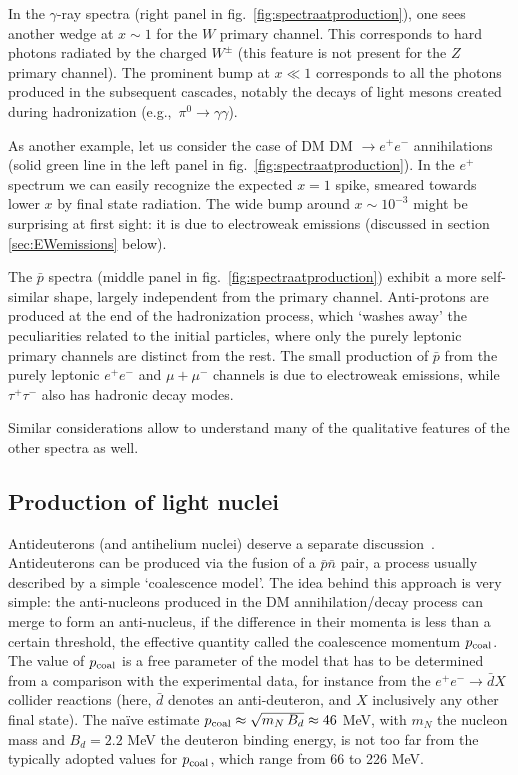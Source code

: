 In the $\gamma$-ray spectra (right panel in fig.~\ref{fig:spectraatproduction}), one sees another wedge at $x \sim 1$ for the $W$ primary channel. This corresponds to hard photons radiated by the charged $W^\pm$ (this feature is not present for the $Z$ primary channel). The prominent bump at $x \ll 1$ corresponds to all the photons produced in the subsequent cascades, notably the decays of light mesons created during hadronization (e.g.,~$\pi^0 \to \gamma \gamma$). 



As another example, let us consider the case of DM DM $\to e^+e^-$ annihilations (solid green line in the left panel in fig.~\ref{fig:spectraatproduction}). In the $e^+$ spectrum we can easily recognize the expected $x=1$ spike, smeared towards lower $x$ by final state radiation. The wide bump around $x\sim 10^{-3}$ might be surprising at first sight: it is due to electroweak emissions (discussed in section \ref{sec:EWemissions} below). 

The $\bar p$ spectra (middle panel in fig.~\ref{fig:spectraatproduction}) exhibit a more self-similar shape, largely independent from the primary channel. Anti-protons are produced at the end of the hadronization process, which `washes away' the peculiarities related to the initial particles, where only the purely leptonic primary channels are distinct from the rest. 
The small production of $\bar p$ from the purely leptonic $e^+e^-$ and $\mu+\mu^-$ channels is due to electroweak emissions, while $\tau^+\tau^-$ also has hadronic decay modes.

Similar considerations allow to understand many of the qualitative features of the other spectra as well. 

\subsection{Production of light nuclei} 
\label{DMspectraDbarHe}
Antideuterons (and antihelium nuclei) deserve a separate discussion~\cite{antiD}. Antideuterons can be produced via the fusion of a $\bar p  \bar n$ pair, a process usually described by a simple `coalescence model'. The idea behind this approach is very simple: the anti-nucleons produced in the DM annihilation/decay process can merge to form an anti-nucleus, if the difference in their momenta is less than a certain threshold, the effective quantity called the coalescence momentum $p_{\rm coal}$. The value of $p_{\rm coal}$ is a free parameter of the model that has to be determined from a comparison with the experimental data, for instance from the $e^+e^- \to \bar d X$ collider reactions (here, $\bar d$ denotes an anti-deuteron, and $X$ inclusively any other  final state). The na\"ive estimate $p_{\rm coal} \approx \sqrt{m_N \, B_d} \approx 46$ MeV, with $m_N$ the nucleon mass 
and $B_d = 2.2$ MeV  the deuteron binding energy, is not too far from the typically adopted values for $p_{\rm coal}$, which range from 66 to 226 MeV.

